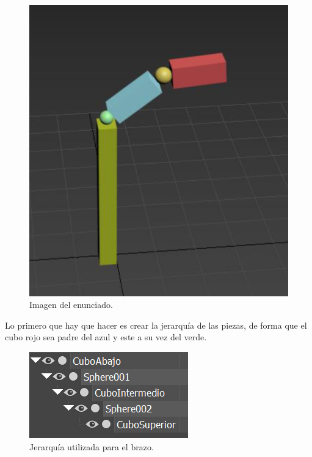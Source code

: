\documentclass{article}
\begin{document}
\begin{figure}[H]
   \centering
   \includegraphics[width=\textwidth]{imagenes/pag42.png}
   \caption{Imagen del enunciado.}
\end{figure}

Lo primero que hay que hacer es crear la jerarquía de las piezas, de forma que el cubo rojo sea padre del azul y este a su vez del verde.

\begin{figure}[H]
   \centering
   \includegraphics[width=\textwidth]{imagenes/jerarquia.png}
   \caption{Jerarquía utilizada para el brazo.}
\end{figure}
\end{document}
